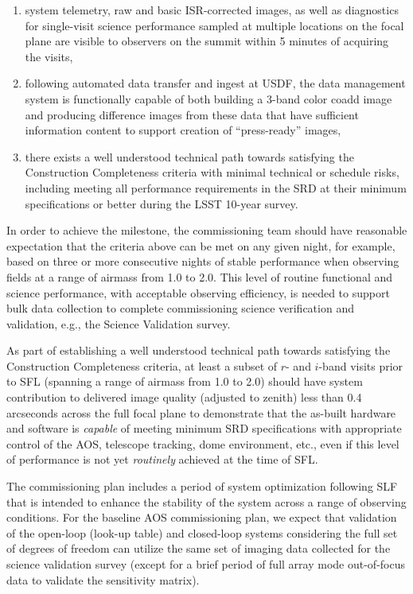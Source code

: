 \documentclass[SE,authoryear,toc,lsstdraft]{lsstdoc}
\begin{document}
\begin{enumerate}
\begin{enumerate}
  \end{enumerate}
  \item system telemetry, raw and basic ISR-corrected images, as well as diagnostics for single-visit science performance sampled at multiple locations on the focal plane are visible to observers on the summit within 5 minutes of acquiring the visits,
  \item following automated data transfer and ingest at USDF, the data management system is functionally capable of both building a 3-band color coadd image and producing difference images from these data that have sufficient information content to support creation of ``press-ready'' images,
  \item there exists a well understood technical path towards satisfying the Construction Completeness criteria  with minimal technical or schedule risks, including meeting all performance requirements in the SRD at their minimum specifications or better during the LSST 10-year survey.
\end{enumerate}

In order to achieve the milestone, the commissioning team should have reasonable expectation that the criteria above can be met on any given night, for example, based on three or more consecutive nights of stable performance when observing fields at a range of airmass from 1.0 to 2.0.
This level of routine functional and science performance, with acceptable observing efficiency, is needed to support bulk data collection to complete commissioning science verification and validation, e.g., the Science Validation survey.

As part of establishing a well understood technical path towards satisfying the Construction Completeness criteria, at least a subset of $r$- and $i$-band visits prior to SFL (spanning a range of airmass from 1.0 to 2.0) should have system contribution to delivered image quality (adjusted to zenith) less than 0.4 arcseconds across the full focal plane to demonstrate that the as-built hardware and software is \emph{capable} of meeting minimum SRD specifications with appropriate control of the AOS, telescope tracking, dome environment, etc., even if this level of performance is not yet \emph{routinely} achieved at the time of SFL.

The commissioning plan includes a period of system optimization following SLF that is intended to enhance the stability of the system across a range of observing conditions.
For the baseline AOS commissioning plan, we expect that validation of the open-loop (look-up table) and closed-loop systems considering the full set of degrees of freedom can utilize the same set of imaging data collected for the science validation survey (except for a brief period of full array mode out-of-focus data to validate the sensitivity matrix).
\end{document}
